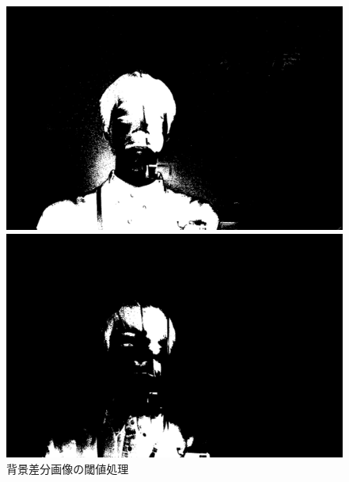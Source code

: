 \begin{figure}[H]
\begin{minipage}[b]{.49\textwidth}
\begin{minipage}[b]{.3\textwidth}
            \includegraphics[keepaspectratio,width=\textwidth]{../../Figures/05_62.png}
        \end{minipage}
        \begin{minipage}[b]{.3\textwidth}
            \centering
            \includegraphics[keepaspectratio,width=\textwidth]{../../Figures/05_63.png}
        \end{minipage}
        \caption{背景差分画像の閾値処理}
    \end{minipage}
\end{figure}
